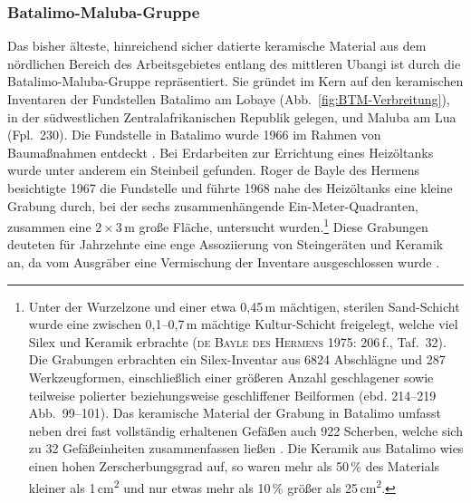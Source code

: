 \subsubsection{Batalimo-Maluba-Gruppe}\label{sec:BTM-Gr}

Das bisher älteste, hinreichend sicher datierte keramische Material aus dem nördlichen Bereich des Arbeitsgebietes entlang des mittleren \mbox{Ubangi} ist durch die Batalimo-Maluba-Gruppe repräsentiert. Sie gründet im Kern auf den keramischen Inventaren der Fundstellen Batalimo am Lobaye (Abb.~\ref{fig:BTM-Verbreitung}), in der südwestlichen Zentralafrikanischen Republik gelegen, und Maluba am Lua (Fpl.~230). Die Fundstelle in Batalimo wurde 1966 im Rahmen von Baumaßnahmen entdeckt \parencite[206\,f.]{deBayledesHermens.1975}. Bei Erdarbeiten zur Errichtung eines Heizöltanks wurde unter anderem ein Steinbeil gefunden. Roger de Bayle des Hermens besichtigte 1967 die Fundstelle und führte 1968 nahe des Heizöltanks eine kleine Grabung durch, bei der sechs zusammenhängende Ein-Meter-Quadranten, zusammen eine 2\,$\times$\,3\,m große Fläche, untersucht wurden.\footnote{Unter der Wurzelzone und einer etwa 0,45\,m mächtigen, sterilen Sand-Schicht wurde eine zwischen 0,1--0,7\,m mächtige Kultur-Schicht freigelegt, welche viel Silex und Keramik erbrachte (\textsc{de Bayle des Hermens} 1975: 206\,f., Taf.~32). Die Grabungen erbrachten ein Silex-Inventar aus 6824 Abschlägne und 287 Werkzeugformen, einschließlich einer größeren Anzahl geschlagener sowie teilweise polierter beziehungsweise geschliffener Beilformen (ebd. 214--219 Abb.~99--101). Das keramische Material der Grabung in Batalimo umfasst neben drei fast vollständig erhaltenen Gefäßen auch 922 Scherben, welche sich zu 32 Gefäßeinheiten zusammenfassen ließen \parencite[221--234, Taf.~33--34]{Aumassip.1975}. Die Keramik aus Batalimo wies einen hohen Zerscherbungsgrad auf, so waren mehr als 50\,\% des Materials kleiner als 1\,cm\textsuperscript{2} und nur etwas mehr als 10\,\% größer als 25\,cm\textsuperscript{2}.} Diese Grabungen deuteten für Jahrzehnte eine enge Assoziierung von Steingeräten und Keramik an, da vom Ausgräber eine Vermischung der Inventare ausgeschlossen wurde \parencites[211\,f.]{deBayledesHermens.1975}[nach][137]{Eggert.1987c}.

